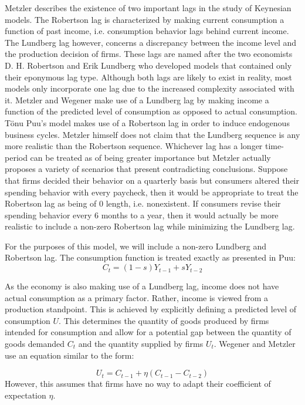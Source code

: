 Metzler describes the existence of two important lags in the study of Keynesian models. The Robertson lag is characterized by making current consumption a function of past income, i.e. consumption behavior lags behind current income. The Lundberg lag however, concerns a discrepancy between the income level and the production decision of firms\autocite{Metzler1941}. These lags are named after the two economists D. H. Robertson and Erik Lundberg who developed models that contained only their eponymous lag type. Although both lags are likely to exist in reality, most models only incorporate one lag due to the increased complexity associated with it. Metzler and Wegener make use of a Lundberg lag by making income a function of the predicted level of consumption as opposed to actual consumption. T\"{o}nu Puu's model makes use of a Robertson lag in order to induce endogenous business cycles. Metzler himself does not claim that the Lundberg sequence is any more realistic than the Robertson sequence. Whichever lag has a longer time-period can be treated as of being greater importance but Metzler actually proposes a variety of scenarios that present contradicting conclusions. Suppose that firms decided their behavior on a quarterly basis but consumers altered their spending behavior with every paycheck, then it would be appropriate to treat the Robertson lag as being of 0 length, i.e. nonexistent. If consumers revise their spending behavior every 6 months to a year, then it would actually be more realistic to include a non-zero Robertson lag while minimizing the Lundberg lag. 

For the purposes of this model, we will include a non-zero Lundberg and Robertson lag. The consumption function is treated exactly as presented in Puu:
\begin{equation}
    C_t=(1-s)Y_{t-1}+sY_{t-2}
\end{equation}

As the economy is also making use of a Lundberg lag, income does not have actual consumption as a primary factor. Rather, income is viewed from a production standpoint. This is achieved by explicitly defining a predicted level of consumption $U$. This determines the quantity of goods produced by firms intended for consumption and allow for a potential gap between the quantity of goods demanded $C_t$ and the quantity supplied by firms $U_t$. Wegener and Metzler use an equation similar to the form:

\begin{equation*} 
    U_t=C_{t-1}+\eta(C_{t-1}-C_{t-2})
\end{equation*}
However, this assumes that firms have no way to adapt their coefficient of expectation $\eta$. 

